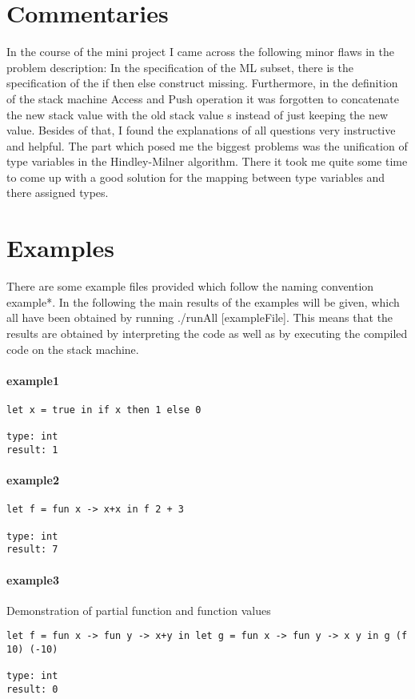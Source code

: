 \documentclass[a4paper, 12pt, titlepage]{article}
\begin{document}
\section{Commentaries}

In the course of the mini project I came across the following minor flaws in the problem description: In the specification of the ML subset, there is the specification of the if then else construct missing. Furthermore, in the definition of the stack machine Access and Push operation it was forgotten to concatenate the new stack value with the old stack value s instead of just keeping the new value. Besides of that, I found the explanations of all questions very instructive and helpful. The part which posed me the biggest problems was the unification of type variables in the Hindley-Milner algorithm. There it took me quite some time to come up with a good solution for the mapping between type variables and there assigned types. 

\section{Examples}

There are some example files provided which follow the naming convention example*. In the following the main results of the examples will be given, which all have been obtained by running ./runAll [exampleFile]. This means that the results are obtained by interpreting the code as well as by executing the compiled code on the stack machine.

\paragraph{example1}
\begin{verbatim}
let x = true in if x then 1 else 0

type: int
result: 1
\end{verbatim}

\paragraph{example2}
\begin{verbatim}
let f = fun x -> x+x in f 2 + 3

type: int
result: 7
\end{verbatim}

\paragraph{example3} 
Demonstration of partial function and function values
\begin{verbatim}
let f = fun x -> fun y -> x+y in let g = fun x -> fun y -> x y in g (f 10) (-10)

type: int
result: 0
\end{verbatim}
\end{document}
